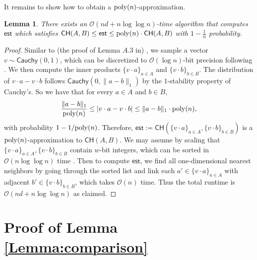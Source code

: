 \documentclass[11pt]{article}
\theoremstyle{plain}
\newtheorem{lem}[theorem]{Lemma}
\newcommand{\OO}{\mathcal{O}}
\begin{document}
It remains to show how to obtain a ${\rm poly}(n)$-approximation.

\begin{lem}
    There exists an $\OO(nd + n\log\log n)$-time algorithm that computes $\mathsf{est}$ which satisfies $\mathsf{CH}(A, B) \leq  \mathsf{est} \leq {\rm poly}(n)\cdot \mathsf{CH}(A, B)$ with $1-\frac{1}{n}$ probability.
\end{lem}

\begin{proof}
    Similar to (the proof of Lemma $A.3$ in) \cite{BIJ24}, we sample a vector $v \sim \mathsf{Cauchy}(0, 1)$, which can be discretized to $\OO(\log n)$-bit precision following \cite{indyk2006stable}. We then compute the inner products $\{ v\cdot a \}_{a \in A}$ and $\{ v\cdot b \}_{b \in B}$. The distribution of $ v \cdot a - v \cdot b$ follows $\mathsf{Cauchy}(0, \lVert a- b\rVert_1)$ by the $1$-stability property of Cauchy's. So we have that for every $a \in A$ and $b \in B$, 
\[ \frac{\lVert a - b\rVert_1}{{\rm poly}(n)} \leq |v \cdot a - v \cdot b| \leq \lVert a - b\rVert_1 \cdot {\rm poly}(n), \]
with probability $1-1/{\rm poly}(n)$. Therefore, $\mathsf{est} := \mathsf{CH}(\{ v\cdot a \}_{a \in A}, \{ v\cdot b \}_{b \in B})$ is a ${\rm poly}(n)$-approximation to $\mathsf{CH}(A,B)$. We may assume by scaling that 
$\{ v\cdot a \}_{a \in A}, \{ v\cdot b \}_{b \in B}$ contain $w$-bit integers, which can be sorted in $\OO(n \log\log n)$ time \cite{AHN95}. Then to compute $\mathsf{est}$, we find all one-dimensional nearest neighbors by going
through the sorted list and link each $a'\in \{ v\cdot a \}_{a \in A}$ with adjacent $b'\in \{ v\cdot b \}_{b \in B}$, which takes $\OO(n)$ time. Thus the total runtime is $\OO(nd + n\log\log n)$ as claimed.
\end{proof}

 \section{Proof of Lemma \ref{Lemma:comparison}}
\end{document}
